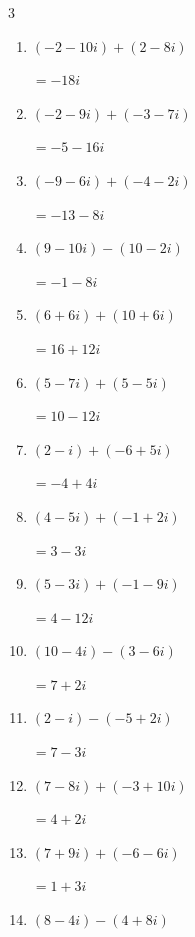\begin{multicols}{3}
\begin{enumerate}
  \item $\displaystyle (-2-10i) + (2-8i)$

        $\displaystyle =-18i$

  \item $\displaystyle (-2-9i) + (-3-7i)$

        $\displaystyle =-5-16i$

  \item $\displaystyle (-9-6i) + (-4-2i)$

        $\displaystyle =-13-8i$

  \item $\displaystyle (9-10i) - (10-2i)$

        $\displaystyle =-1-8i$

  \item $\displaystyle (6+6i) + (10+6i)$

        $\displaystyle =16+12i$

  \item $\displaystyle (5-7i) + (5-5i)$

        $\displaystyle =10-12i$

  \item $\displaystyle (2-i) + (-6+5i)$

        $\displaystyle =-4+4i$

  \item $\displaystyle (4-5i) + (-1+2i)$

        $\displaystyle =3-3i$

  \item $\displaystyle (5-3i) + (-1-9i)$

        $\displaystyle =4-12i$

  \item $\displaystyle (10-4i) - (3-6i)$

        $\displaystyle =7+2i$

  \item $\displaystyle (2-i) - (-5+2i)$

        $\displaystyle =7-3i$

  \item $\displaystyle (7-8i) + (-3+10i)$

        $\displaystyle =4+2i$

  \item $\displaystyle (7+9i) + (-6-6i)$

        $\displaystyle =1+3i$

\columnbreak %

  \item $\displaystyle (8-4i) - (4+8i)$


\end{enumerate}
\end{multicols}
